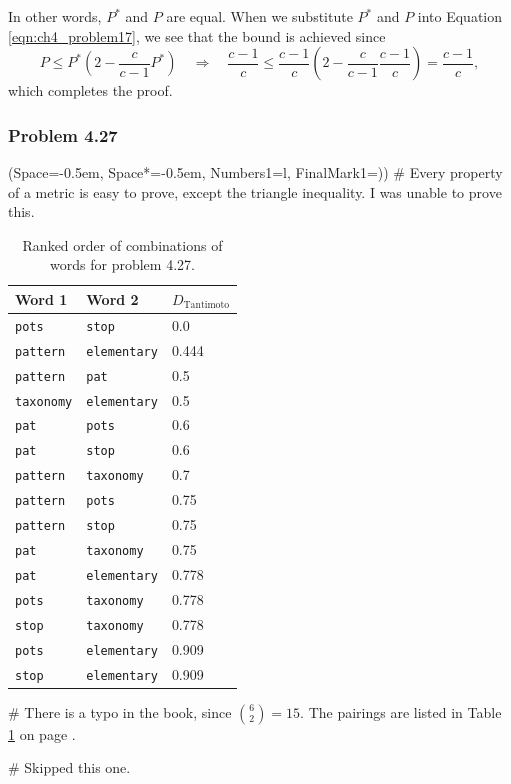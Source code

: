 \documentclass[12pt, a4paper]{article}
\newcommand{\listSpace}{-0.5em}%
\begin{document}
In other words, $P^*$ and $P$ are equal. 
When we substitute $P^*$ and $P$ into Equation \eqref{eqn:ch4_problem17}, we see that the bound is achieved since 
\begin{equation*}
	P \leq P^* \left( 2 - \frac{c}{c - 1}P^* \right) 
	\quad  \Rightarrow \quad
	\frac{c-1}{c} \leq \frac{c-1}{c} \left( 2 - \frac{c}{c-1} \frac{c-1}{c}  \right) = \frac{c-1}{c},
\end{equation*}
which completes the proof.



\subsubsection*{Problem 4.27}
\begin{easylist}[enumerate]
\ListProperties(Space=\listSpace, Space*=\listSpace, Numbers1=l, FinalMark1={)})
# Every property of a metric is easy to prove, except the triangle inequality.
I was unable to prove this.

\begin{table}[ht!]
	\centering
	\caption{Ranked order of combinations of words for problem 4.27.}
	\begin{tabular}{@{}lll@{}} \toprule
	Word 1	& Word 2 & $D_\text{Tantimoto}$ \\ \midrule
	\texttt{pots} & \texttt{stop} &  0.0 \\ 
	\texttt{pattern} & \texttt{elementary} &  0.444 \\ 
	\texttt{pattern} & \texttt{pat} &  0.5 \\ 
	\texttt{taxonomy} & \texttt{elementary} &  0.5 \\ 
	\texttt{pat} & \texttt{pots} &  0.6 \\ 
	\texttt{pat} & \texttt{stop} &  0.6 \\ 
	\texttt{pattern} & \texttt{taxonomy} &  0.7 \\ 
	\texttt{pattern} & \texttt{pots} &  0.75 \\ 
	\texttt{pattern} & \texttt{stop} &  0.75 \\ 
	\texttt{pat} & \texttt{taxonomy} &  0.75 \\ 
	\texttt{pat} & \texttt{elementary} &  0.778 \\ 
	\texttt{pots} & \texttt{taxonomy} &  0.778 \\ 
	\texttt{stop} & \texttt{taxonomy} &  0.778 \\ 
	\texttt{pots} & \texttt{elementary} &  0.909 \\ 
	\texttt{stop} & \texttt{elementary} &  0.909 \\  \bottomrule
	\end{tabular}
	\label{table:problem_4_17}
\end{table}


# There is a typo in the book, since $\binom{6}{2} = 15$.
The pairings are listed in Table \ref{table:problem_4_17} on page \pageref{table:problem_4_17}.

# Skipped this one.
\end{easylist}
\end{document}
